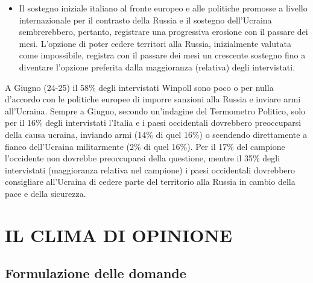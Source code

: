 \documentclass[
]{book}
\providecommand{\tightlist}{%
  \setlength{\itemsep}{0pt}\setlength{\parskip}{0pt}}
\begin{document}
\begin{itemize}
\tightlist
\item
  Il sostegno iniziale italiano al fronte europeo e alle politiche promosse a livello internazionale per il contrasto della Russia e il sostegno dell'Ucraina sembrerebbero, pertanto, registrare una progressiva erosione con il passare dei mesi. L'opzione di poter cedere territori alla Russia, inizialmente valutata come impossibile, registra con il passare dei mesi un crescente sostegno fino a diventare l'opzione preferita dalla maggioranza (relativa) degli intervistati.
\end{itemize}

A Giugno (24-25) il 58\% degli intervistati Winpoll sono poco o per nulla d'accordo con le politiche europee di imporre sanzioni alla Russia e inviare armi all'Ucraina.
Sempre a Giugno, secondo un'indagine del Termometro Politico, solo per il 16\% degli intervistati l'Italia e i paesi occidentali dovrebbero preoccuparsi della causa ucraina, inviando armi (14\% di quel 16\%) o scendendo direttamente a fianco dell'Ucraina militarmente (2\% di quel 16\%). Per il 17\% del campione l'occidente non dovrebbe preoccuparsi della questione, mentre il 35\% degli intervistati (maggioranza relativa nel campione) i paesi occidentali dovrebbero consigliare all'Ucraina di cedere parte del territorio alla Russia in cambio della pace e della sicurezza.

\hypertarget{il-clima-di-opinione}{%
\chapter{IL CLIMA DI OPINIONE}\label{il-clima-di-opinione}}

\hypertarget{formulazione-delle-domande-5}{%
\section{Formulazione delle domande}\label{formulazione-delle-domande-5}}
\end{document}

